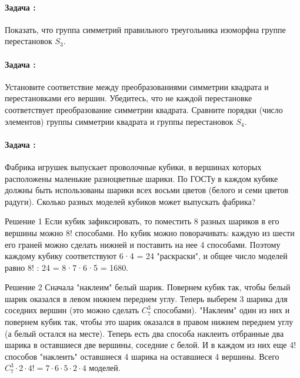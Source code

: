 \documentclass[amsmath,amssymb,12pt]{revtex4}
\newif\ifimportant
\newcommand{\1}{\frac{1}{2}}
\begin{document}
\paragraph*{Задача \theprn: }
%

Показать, что группа симметрий правильного треугольника изоморфна группе перестановок $S_{3}$. 

\ifimportant
\medskip
\noindent
Решение
Сравнить таблицы умножений двух групп.
\fi


\addtocounter{prn}{1}
\vspace{0.3cm}
\paragraph*{Задача \theprn: }
%

Установите соответствие между преобразованиями симметрии квадрата и перестановками его вершин. Убедитесь, что не каждой перестановке соответствует преобразование симметрии квадрата. Сравните порядки (число элементов) группы симметрии квадрата и группы перестановок $S_{4}$.

\ifimportant
\medskip
\noindent
Решение

\fi



\addtocounter{prn}{1}
\vspace{0.3cm}
\paragraph*{Задача \theprn: }

Фабрика игрушек выпускает проволочные кубики, в вершинах которых расположены маленькие разноцветные шарики. По ГОСТу в каждом кубике должны быть использованы шарики всех восьми цветов (белого и семи цветов радуги). Сколько разных моделей кубиков может выпускать фабрика?

\ifimportant
\medskip
\noindent
Решение 1
Если кубик зафиксировать, то поместить 8 разных шариков в его вершины можно 8! способами. Но кубик можно поворачивать: каждую из шести его граней можно сделать нижней и поставить на нее 4 способами. Поэтому каждому кубику соответствуют  6·4 = 24  "раскраски", и общее число моделей равно  8! : 24 = 8·7·6·5 = 1680.

Решение 2
Сначала "наклеим" белый шарик. Повернем кубик так, чтобы белый шарик оказался в левом нижнем переднем углу. Теперь выберем 3 шарика для соседних вершин (это можно сделать $C_{7}^{3}$  способами). "Наклеим" один из них и повернем кубик так, чтобы это шарик оказался в правом нижнем переднем углу (а белый остался на месте). Теперь есть два способа наклеить отбранные два шарика в оставшиеся две вершины, соседние с белой. И в каждом из них еще 4! способов "наклеить" оставшиеся 4 шарика на оставшиеся 4 вершины. Всего $C_{7}^{3}\cdot 2\cdot 4!=7\cdot 6\cdot 5\cdot 2\cdot 4$     моделей.
\end{document}
